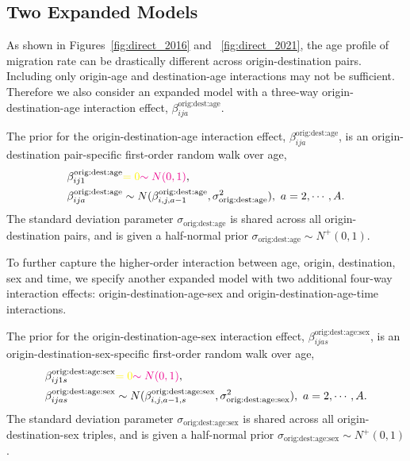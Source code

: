 \documentclass{article}
\begin{document}
\subsection{Two Expanded Models}
As shown in Figures~\ref{fig:direct_2016} and ~\ref{fig:direct_2021}, the age profile of migration rate can be drastically different across origin-destination pairs. Including only origin-age and destination-age interactions may not be sufficient. Therefore we also consider an expanded model with a three-way origin-destination-age interaction effect, $\beta_{ija}^{\text{orig:dest:age}}$. 

The prior for the origin-destination-age interaction effect, $\beta_{ija}^{\text{orig:dest:age}}$, is an origin-destination pair-specific first-order random walk over age,
\begin{equation}
\begin{aligned}
\beta_{ij1}^{\text{orig:dest:age}}&{\color{yellow}=0}{\color{magenta}\sim N(0,1)},\\
\beta_{ija}^{\text{orig:dest:age}}&\sim N(\beta_{i,j,a-1}^{\text{orig:dest:age}},\sigma_{\text{orig:dest:age}}^2),\ a=2,\cdots,A.
\end{aligned}
\end{equation}
The standard deviation parameter $\sigma_{\text{orig:dest:age}}$ is shared across all origin-destination pairs, and is given a half-normal prior $\sigma_{\text{orig:dest:age}}\sim N^+(0,1)$. 

To further capture the higher-order interaction between age, origin, destination, sex and time, we specify another expanded model with two additional four-way interaction effects: origin-destination-age-sex and origin-destination-age-time interactions. 

The prior for the origin-destination-age-sex interaction effect, $\beta_{ijas}^{\text{orig:dest:age:sex}}$, is an origin-destination-sex-specific first-order random walk over age,
\begin{equation}
\begin{aligned}
\beta_{ij1s}^{\text{orig:dest:age:sex}}&{\color{yellow}=0}{\color{magenta}\sim N(0,1)},\\
\beta_{ijas}^{\text{orig:dest:age:sex}}&\sim N(\beta_{i,j,a-1,s}^{\text{orig:dest:age:sex}},\sigma_{\text{orig:dest:age:sex}}^2),\ a=2,\cdots,A.
\end{aligned}
\end{equation}
The standard deviation parameter $\sigma_{\text{orig:dest:age:sex}}$ is shared across all origin-destination-sex triples, and is given a half-normal prior $\sigma_{\text{orig:dest:age:sex}}\sim N^+(0,1)$. 
\end{document}

